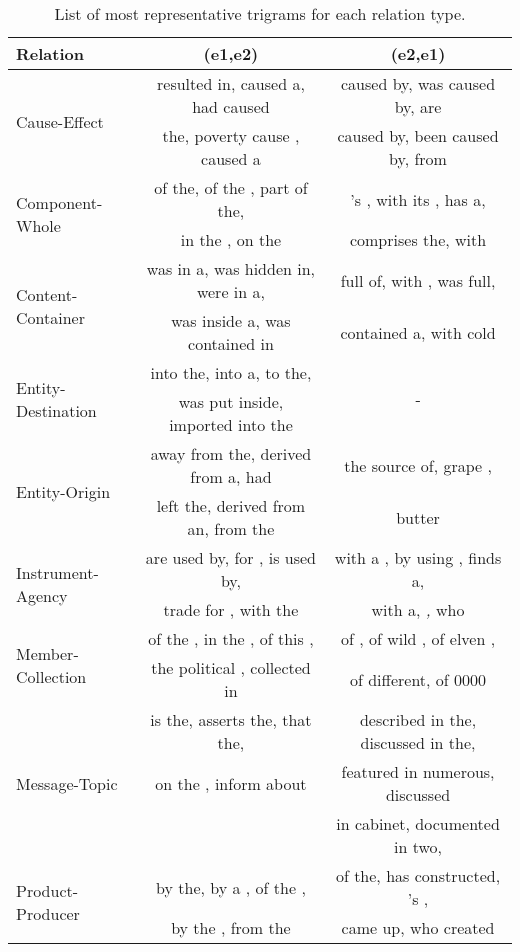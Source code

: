 \documentclass[11pt]{article}
\begin{document}
\begin{table*}[ht!]
\begin{small}
\begin{center}
\begin{tabular}{|l|c|c|}
\hline  
  \bf Relation & \bf (e1,e2) & \bf (e2,e1)  \\
\hline
 \multirow{2}{*}{Cause-Effect} &  resulted in,  caused a, had caused &  caused by, was caused by, are \\
                               & the, poverty cause , caused a   & caused by, been caused by,  from  \\
\hline
  \multirow{2}{*}{Component-Whole} &  of the, of the , part of the, &  's , with its ,  has a, \\
                                   & in the ,  on the  &   comprises the,  with  \\
\hline
 \multirow{2}{*}{Content-Container} & was in a, was hidden in, were in a, &  full of,  with ,  was full, \\
                    & was inside a, was contained in      &  contained a,  with cold \\
\hline
 \multirow{2}{*}{Entity-Destination} &  into the,  into a,  to the, & \multirow{2}{*}{-}\\
                    & was put inside, imported into the  & \\
\hline
 \multirow{2}{*}{Entity-Origin} & away from the, derived from a, had & the source of,  grape , \\
                      & left the, derived from an,  from the       &   butter  \\
\hline
 \multirow{2}{*}{Instrument-Agency} & are used by,  for , is used by, & with a , by using ,  finds a, \\
                                    & trade for , with the    &  with a,  \emph{,} who \\
\hline
 \multirow{2}{*}{Member-Collection} & of the , in the , of this ,  &  of , of wild , of elven , \\
                                    & the political ,  collected in  &   of different, of 0000  \\
\hline
 \multirow{3}{*}{Message-Topic}     &  is the,  asserts the,  that the, & described in the, discussed in the, \\
                                    & on the ,  inform about  & featured in numerous, discussed  \\
                                    &                             & in cabinet, documented in two, \\
\hline
 \multirow{2}{*}{Product-Producer}  &  by the, by a , of the , &  of the,  has constructed,  's , \\
                                    & by the , from the          &   came up,  who created \\
\hline
\end{tabular}
\end{center}
\end{small}
\caption{\label{tab:res:ngrams} List of most representative trigrams for each relation type.}
\end{table*}
\end{document}
